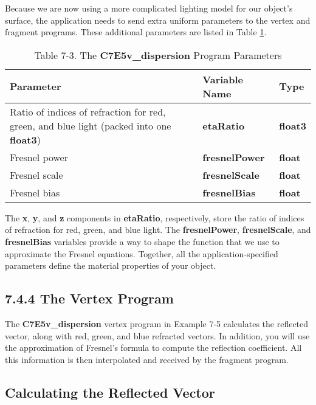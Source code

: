 \documentclass[../main.tex]{subfiles}
\begin{document}
Because we are now using a more complicated lighting model for our object's surface, the application needs to send extra uniform parameters to the vertex and fragment programs. These additional parameters are listed in Table \ref{table:7-3}.

\begin{table}
\centering
\begin{tabular}{ p{5cm} p{4cm} p{2cm}  } 

Parameter & Variable Name & Type \\
\hline

Ratio of indices of refraction for red, green, and blue light (packed into one \textbf{float3}) & \textbf{etaRatio} & \textbf{float3} \\
Fresnel power & \textbf{fresnelPower} & \textbf{float} \\
Fresnel scale & \textbf{fresnelScale} & \textbf{float} \\
Fresnel bias & \textbf{fresnelBias} & \textbf{float} \\

\hline

\end{tabular}

\caption{Table 7-3. The \textbf{C7E5v_dispersion} Program Parameters}
\label{table:7-3}

\end{table}

The \textbf{x}, \textbf{y}, and \textbf{z} components in \textbf{etaRatio}, respectively, store the ratio of indices of refraction for red, green, and blue light. The \textbf{fresnelPower}, \textbf{fresnelScale}, and \textbf{fresnelBias} variables provide a way to shape the function that we use to approximate the Fresnel equations. Together, all the application-specified parameters define the material properties of your object.

\subsection{7.4.4 The Vertex Program}

The \textbf{C7E5v_dispersion} vertex program in Example 7-5 calculates the reflected vector, along with red, green, and blue refracted vectors. In addition, you will use the approximation of Fresnel's formula to compute the reflection coefficient. All this information is then interpolated and received by the fragment program.

\subsection*{Calculating the Reflected Vector}
\end{document}
